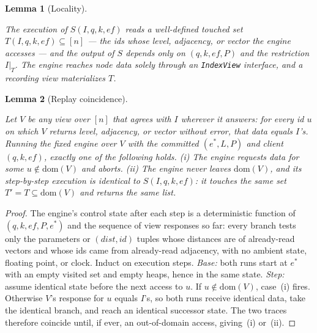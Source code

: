 \documentclass[11pt]{article}
\newtheorem{lemma}{Lemma}
\begin{document}
\begin{lemma}[Locality]\label{lem:locality}

The execution of $S(I,q,k,\mathit{ef})$ reads a well-defined
\emph{touched set} $T(I,q,k,\mathit{ef})\subseteq[n]$ --- the ids whose
level, adjacency, or vector the engine accesses --- and the output of
$S$ depends only on $(q,k,\mathit{ef},P)$ and the restriction $I|_T$.
The engine reaches node data solely through an \texttt{IndexView}
interface, and a recording view materializes $T$.

\end{lemma}

\begin{lemma}[Replay coincidence]\label{lem:coincidence}

Let $V$ be any view over $[n]$ that agrees with $I$ wherever it answers:
for every id $u$ on which $V$ returns level, adjacency, or vector
without error, that data equals $I$'s. Running the fixed engine over $V$
with the committed $(e^*,L,P)$ and client $(q,k,\mathit{ef})$, exactly
one of the following holds. \emph{(i)} The engine requests data for some
$u\notin\mathrm{dom}(V)$ and aborts. \emph{(ii)} The engine never leaves
$\mathrm{dom}(V)$, and its step-by-step execution is identical to
$S(I,q,k,\mathit{ef})$: it touches the same set
$T'=T\subseteq\mathrm{dom}(V)$ and returns the same list.

\end{lemma}

\begin{proof}

The engine's control state after each step is a deterministic function
of $(q,k,\mathit{ef},P,e^*)$ and the sequence of view responses so far:
every branch tests only the parameters or $(\mathit{dist},\mathit{id})$
tuples whose distances are of already-read vectors and whose ids came
from already-read adjacency, with no ambient state, floating point, or
clock. Induct on execution steps. \emph{Base:} both runs start at $e^*$
with an empty visited set and empty heaps, hence in the same state.
\emph{Step:} assume identical state before the next access to $u$. If
$u\notin\mathrm{dom}(V)$, case~(i) fires. Otherwise $V$'s response for
$u$ equals $I$'s, so both runs receive identical data, take the
identical branch, and reach an identical successor state. The two traces
therefore coincide until, if ever, an out-of-domain access, giving~(i)
or~(ii).

\end{proof}
\end{document}
